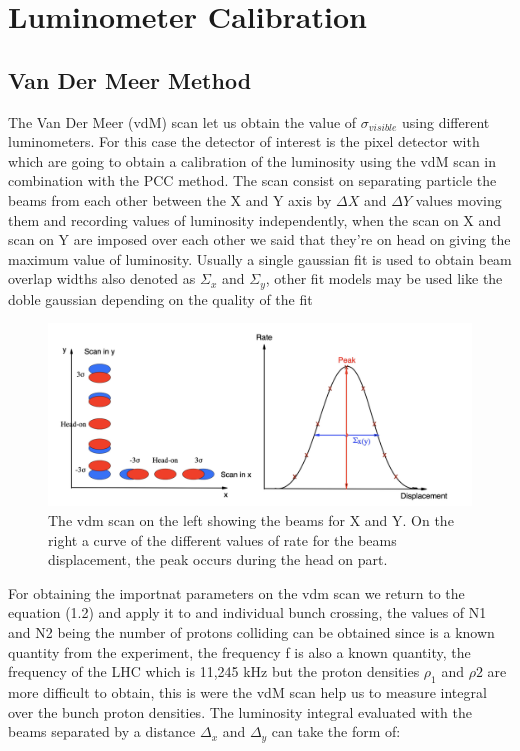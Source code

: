 \chapter{Luminometer Calibration}
\label{ch3}

\section{Van Der Meer Method}

The Van Der Meer (vdM) scan let us obtain the value of $\sigma_{visible}$ using different luminometers. For this case the detector of interest is the pixel detector with which are going to obtain a calibration of the luminosity using the vdM scan in combination with the PCC method. The scan consist on separating particle the beams from each other between the X and Y axis by $\Delta X$ and $\Delta Y$ values moving them and recording values of luminosity independently, when the scan on X and scan on Y are imposed over each other we said that they're on head on giving the maximum value of luminosity. Usually a single gaussian fit is used to obtain beam overlap widths also denoted as $\Sigma_{x}$ and $\Sigma_{y}$, other fit models may be used like the doble gaussian depending on the quality of the fit \cite{Vdm}

\begin{figure}[h]
    \centering
    \includegraphics[width=1\textwidth]{vdm1.png}
    \caption{The vdm scan on the left showing the beams for X and Y. On the right a curve of the different values of rate for the beams displacement, the peak occurs during the head on part.}
    \label{fig:vdm1}
\end{figure}


For obtaining the importnat parameters on the vdm scan we return to the equation (1.2) and apply it to and individual bunch crossing, the values of N1 and N2 being the number of protons colliding can be obtained since is a known quantity from the experiment, the frequency f is also a known quantity, the frequency of the LHC which is 11,245 kHz but the proton densities $\rho_{1}$ and $\rho{2}$ are more difficult to obtain, this is were the vdM scan help us to measure integral over the bunch proton densities. The luminosity integral evaluated with the beams separated by a distance $\Delta_{x}$ and $\Delta_{y}$ can take the form of: 

